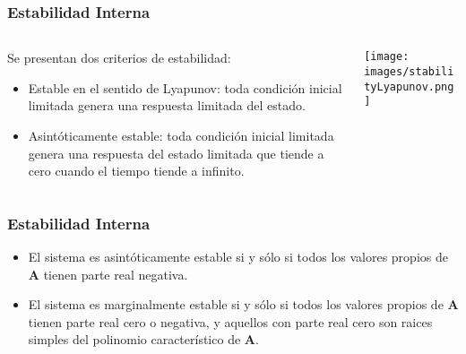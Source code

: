 \documentclass[aspectratio=169]{beamer}
\theoremstyle{definition}
\theoremstyle{plain}
\theoremstyle{remark}
\begin{document}
\begin{frame}[<+->]\frametitle{Estabilidad Interna}
\vspace*{5mm}
\begin{columns}
\begin{column}{0.5\textwidth}
Se presentan dos criterios de estabilidad:
\begin{itemize}
  \item Estable en el sentido de Lyapunov: toda condición inicial limitada genera una respuesta limitada del estado.
  \item Asintóticamente estable: toda condición inicial limitada genera una respuesta del estado limitada que tiende a cero cuando el tiempo tiende a infinito. 
\end{itemize}
\end{column}	
\begin{column}{0.5\textwidth}
\centering
\texttt{[image: images/stabilityLyapunov.png]}
\end{column}	
\end{columns}
\end{frame}

\begin{frame}[<-+>]\frametitle{Estabilidad Interna}
\begin{theorem}\label{th:internalStability1}
\begin{itemize}
  \item El sistema es asintóticamente estable si y sólo si todos los valores propios de $\mathbf{A}$ tienen parte real negativa.
  \item El sistema es marginalmente estable si y sólo si todos los valores propios de $\mathbf{A}$ tienen parte real cero o negativa, y aquellos con parte real cero son raices simples del polinomio característico de $\mathbf{A}$.
\end{itemize}
\end{theorem}
\end{frame}
\end{document}

